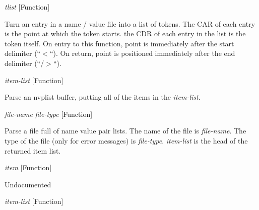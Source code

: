 \vspace{1em}
\noindent
{}
\usebox{\funcname}\emph{tlist}
 \hfill [Function]

\begin{doc-string}
Turn an entry in a name / value file into a list of tokens.  The CAR of each entry is the point
at which the token starts.  the CDR of each entry in the list is the token itself.  On entry
to this function, point is immediately after the start delimiter (``$<$``).  On return, point
is positioned immediately after the end delimiter (``/$>$``).
\end{doc-string}

\vspace{1em}
\noindent
{}
\usebox{\funcname}\emph{item-list}
 \hfill [Function]

\begin{doc-string}
Parse an nvplist buffer, putting all of the items in the \emph{item-list}.
\end{doc-string}

\vspace{1em}
\noindent
{}
\usebox{\funcname}\emph{file-name} \emph{file-type}
 \hfill [Function]
\hspace*{\wd\funcname}

\begin{doc-string}
Parse a file full of name value pair lists.  The name of the file is \emph{file-name}.
The type of the file (only for error messages) is \emph{file-type}.  \emph{item-list} is the head
of the returned item list.
\end{doc-string}

\vspace{1em}
\noindent
{}
\usebox{\funcname}\emph{item}
 \hfill [Function]

\begin{doc-string}
Undocumented
\end{doc-string}

\vspace{1em}
\noindent
{}
\usebox{\funcname}\emph{item-list}
 \hfill [Function]

